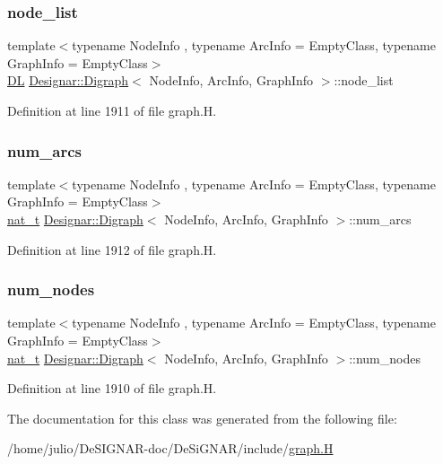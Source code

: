 \subsubsection{\texorpdfstring{node\+\_\+list}{node\_list}}
{\footnotesize\ttfamily template$<$typename Node\+Info , typename Arc\+Info  = Empty\+Class, typename Graph\+Info  = Empty\+Class$>$ \\
\hyperlink{class_designar_1_1_d_l}{DL} \hyperlink{class_designar_1_1_digraph}{Designar\+::\+Digraph}$<$ Node\+Info, Arc\+Info, Graph\+Info $>$\+::node\+\_\+list\hspace{0.3cm}{\ttfamily [protected]}}



Definition at line 1911 of file graph.\+H.

\mbox{\label{class_designar_1_1_digraph_accd2da6bdb5bc0624e7f79c904c89328}} 
\subsubsection{\texorpdfstring{num\+\_\+arcs}{num\_arcs}}
{\footnotesize\ttfamily template$<$typename Node\+Info , typename Arc\+Info  = Empty\+Class, typename Graph\+Info  = Empty\+Class$>$ \\
\hyperlink{namespace_designar_aa72662848b9f4815e7bf31a7cf3e33d1}{nat\+\_\+t} \hyperlink{class_designar_1_1_digraph}{Designar\+::\+Digraph}$<$ Node\+Info, Arc\+Info, Graph\+Info $>$\+::num\+\_\+arcs\hspace{0.3cm}{\ttfamily [protected]}}



Definition at line 1912 of file graph.\+H.

\mbox{\label{class_designar_1_1_digraph_a468cec4048ff9042a288dca47ad856aa}} 
\subsubsection{\texorpdfstring{num\+\_\+nodes}{num\_nodes}}
{\footnotesize\ttfamily template$<$typename Node\+Info , typename Arc\+Info  = Empty\+Class, typename Graph\+Info  = Empty\+Class$>$ \\
\hyperlink{namespace_designar_aa72662848b9f4815e7bf31a7cf3e33d1}{nat\+\_\+t} \hyperlink{class_designar_1_1_digraph}{Designar\+::\+Digraph}$<$ Node\+Info, Arc\+Info, Graph\+Info $>$\+::num\+\_\+nodes\hspace{0.3cm}{\ttfamily [protected]}}



Definition at line 1910 of file graph.\+H.



The documentation for this class was generated from the following file\+:\begin{DoxyCompactItemize}
\item 
/home/julio/\+De\+S\+I\+G\+N\+A\+R-\/doc/\+De\+Si\+G\+N\+A\+R/include/\hyperlink{graph_8_h}{graph.\+H}\end{DoxyCompactItemize}
